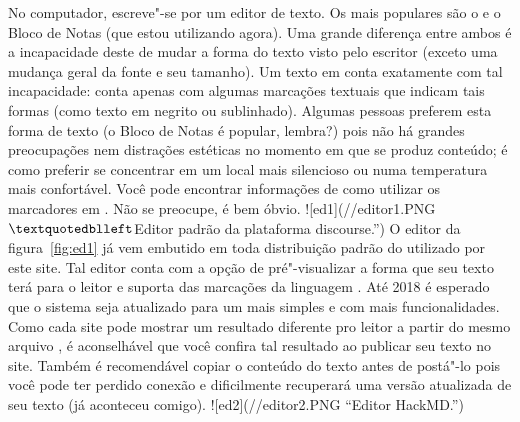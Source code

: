 {}\markdownRendererInterblockSeparator
{}No computador, escreve"-se por um editor de texto. Os mais populares são o  e o Bloco de Notas (que estou utilizando agora). Uma grande diferença entre ambos é a incapacidade deste de mudar a forma do texto visto pelo escritor (exceto uma mudança geral da fonte e seu tamanho). Um texto em  conta exatamente com tal incapacidade: conta apenas com algumas marcações textuais que indicam tais formas (como texto em negrito ou sublinhado). Algumas pessoas preferem esta forma de texto (o Bloco de Notas é popular, lembra?) pois não há grandes preocupações nem distrações estéticas no momento em que se produz conteúdo; é como preferir se concentrar em um local mais silencioso ou numa temperatura mais confortável. Você pode encontrar informações de como utilizar os marcadores em  . Não se preocupe, é bem óbvio.\markdownRendererInterblockSeparator
{}![ed1](\fontes/\caminho/editor1.PNG \(\textquotedblleft \)Editor padrão da plataforma discourse.\textquotedblright{})\markdownRendererInterblockSeparator
{}O editor da figura~\ref{fig:ed1} já vem embutido em toda distribuição padrão do  utilizado por este site. Tal editor conta com a opção de pré"-visualizar a forma que seu texto terá para o leitor e suporta  das marcações da linguagem . Até 2018 é esperado que o sistema seja atualizado para um mais simples e com mais funcionalidades. Como cada site pode mostrar um resultado diferente pro leitor a partir do mesmo arquivo , é aconselhável que você confira tal resultado ao publicar seu texto no site. Também é recomendável copiar o conteúdo do texto antes de postá"-lo pois você pode ter perdido conexão e dificilmente recuperará uma versão atualizada de seu texto (já aconteceu comigo).\markdownRendererInterblockSeparator
{}![ed2](\fontes/\caminho/editor2.PNG \textquotedblleft Editor HackMD.\textquotedblright{})\markdownRendererInterblockSeparator

